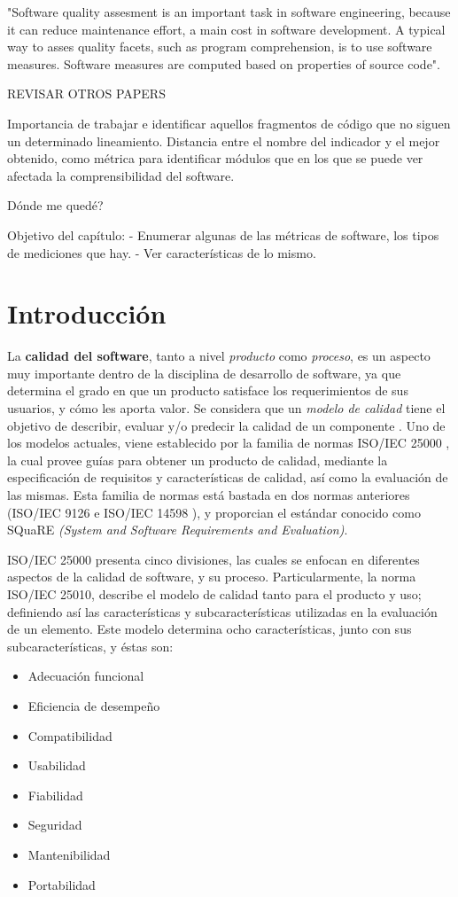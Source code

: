 "Software quality assesment is an important task in software engineering, because it can
reduce maintenance effort, a main cost in software development.
A typical way to asses quality facets, such as program comprehension, is to use software
measures.
Software measures are computed based on properties of source code"\cite{Feigenspan2011}.

REVISAR OTROS PAPERS

Importancia de trabajar e identificar aquellos fragmentos de código que no siguen un
determinado lineamiento.
Distancia entre el nombre del indicador y el mejor obtenido, como métrica para identificar
módulos que en los que se puede ver afectada la comprensibilidad del software.

Dónde me quedé?

Objetivo del capítulo:
- Enumerar algunas de las métricas de software, los tipos de mediciones que hay.
- Ver características de lo mismo.

\section{Introducción}

La \textbf{calidad del software}, tanto a nivel \textit{producto} como \textit{proceso}, 
es un aspecto muy importante dentro de la disciplina de desarrollo de software, ya que
determina el grado en que un producto satisface los requerimientos de sus usuarios, y cómo
les aporta valor.
Se considera que un \textit{modelo de calidad} tiene el objetivo de describir, evaluar y/o 
predecir la calidad de un componente \cite{Wagner2013}.
Uno de los modelos actuales, viene establecido por la familia de normas ISO/IEC 25000 \cite{ref}, 
la cual provee guías para obtener un producto de calidad, mediante la especificación 
de requisitos y características de calidad, así como la evaluación de las mismas.
Esta familia de normas está bastada en dos normas anteriores (ISO/IEC 9126 \cite{ref}
e ISO/IEC 14598 \cite{ref}), y proporcian el estándar conocido como SQuaRE 
\textit{(System and Software Requirements and Evaluation)}.

ISO/IEC 25000 presenta cinco divisiones, las cuales se enfocan en diferentes aspectos
de la calidad de software, y su proceso.
Particularmente, la norma ISO/IEC 25010, describe el modelo de calidad tanto para el producto
y uso; definiendo así las características y subcaracterísticas utilizadas en la evaluación
de un elemento.
Este modelo determina ocho características, junto con sus subcaracterísticas, y éstas son:
\begin{itemize}
    \item Adecuación funcional
    \item Eficiencia de desempeño
    \item Compatibilidad
    \item Usabilidad
    \item Fiabilidad
    \item Seguridad
    \item Mantenibilidad
    \item Portabilidad
\end{itemize}

